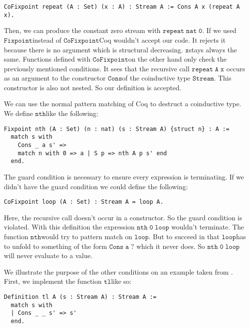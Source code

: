 \documentclass[a4paper,cleardoubleempty,BCOR1cm]{scrbook}
\begin{document}
\begin{verbatim}
CoFixpoint repeat (A : Set) (x : A) : Stream A := Cons A x (repeat A x).
\end{verbatim}

Then, we can produce the constant zero stream with $\mathtt{repeat\;nat\;0}$. If we used
$\mathtt{Fixpoint}$\;instead of $\mathtt{CoFixpoint}$\;Coq wouldn't accept our code. It rejects
it because there is no argument which is structural decreasing. $\mathtt{x}$\;stays
always the same. Functions defined with $\mathtt{CoFixpoint}$\;on the other hand only
check the previously mentioned conditions. It sees that the recursive call $\mathtt{repeat\;A\;x}$
occurs as an argument to the constructor $\mathtt{Cons}$\;of the coinductive type
$\mathtt{Stream}$. This constructor is also not nested. So our definition is accepted.

We can use the normal pattern matching of Coq to destruct a coinductive type.
We define $\mathtt{nth}$\;like the following:

\begin{verbatim}
Fixpoint nth (A : Set) (n : nat) (s : Stream A) {struct n} : A :=
  match s with
    Cons _ a s' =>
    match n with 0 => a | S p => nth A p s' end
  end.
\end{verbatim}

The guard condition is necessary to ensure every expression is terminating.
If we didn't have the guard condition we could define the following:

\begin{verbatim}
CoFixpoint loop (A : Set) : Stream A = loop A.
\end{verbatim}

Here, the recursive call doesn't occur in a constructor. So the guard
condition is violated. With this definition the expression $\mathtt{nth\;0\;loop}$
wouldn't terminate. The function $\mathtt{nth}$\;would try to pattern match on $\mathtt{loop}$. But to
succeed in that $\mathtt{loop}$\;has to unfold to something of the form $\mathtt{Cons\;a\;?}$
which it never does. So $\mathtt{nth\;0\;loop}$\;will never evaluate to a value.

We illustrate the purpose of the other conditions on an example taken from
\cite{chlipala2013certified}.  First, we implement the function $\mathtt{tl}$\;like so:

\begin{verbatim}
Definition tl A (s : Stream A) : Stream A :=
  match s with
  | Cons _ _ s' => s'
  end.
\end{verbatim}
\end{document}
